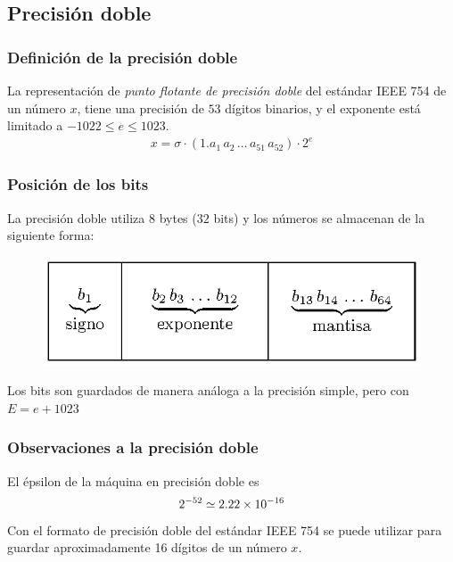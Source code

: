\subsection{Precisión doble}
\begin{frame}
\frametitle{Definición de la precisión doble}
La representación de \emph{punto flotante de precisión doble} del estándar IEEE 754 de un número $x$, tiene una precisión de $53$ dígitos binarios, y el exponente está limitado a $-1022 \leq e \leq 1023$.
\begin{align*}
x = \sigma \cdot (1.a_{1} \, a_{2} \, \ldots \, a_{51} \, a_{52}) \cdot 2^{e}
\end{align*}
\end{frame}
\begin{frame}
\frametitle{Posición de los bits}
La precisión doble utiliza $8$ bytes ($32$ bits) y los números se almacenan de la siguiente forma:
\begin{figure}
    \centering
    \includegraphics[scale=1.2]{Imagenes/precision_doble.eps}
\end{figure}
\vspace*{-1cm}
Los bits son guardados de manera análoga a la precisión simple, pero con $E = e + 1023$
\end{frame}
\begin{frame}
\frametitle{Observaciones a la precisión doble}
El épsilon de la máquina en precisión doble es
\begin{align*}
2^{-52} \simeq \num{2.22d-16}
\end{align*}
\pause
Con el formato de precisión doble del estándar IEEE 754 se puede utilizar para guardar aproximadamente 16 dígitos de un número $x$.
\end{frame}

